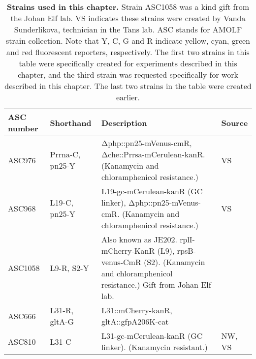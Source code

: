\begin{table}[h]
    \begin{tabularx}{\textwidth}{llXl}
        \textbf{ASC number}	& \textbf{Shorthand} & \textbf{Description} & \textbf{Source}		\\
        \hline
        ASC976  &	Prrna-C, pn25-Y	&	Δphp::pn25-mVenus-cmR, Δche::Prrsa-mCerulean-kanR. (Kanamycin and chloramphenicol resistance.)  & VS \\
        ASC968	& L19-C, pn25-Y	& L19-gc-mCerulean-kanR (GC linker), Δphp::pn25-mVenus-cmR.	(Kanamycin and chloramphenicol resistance.)	& VS \\
        ASC1058	& L9-R, S2-Y	& Also known as JE202. rplI-mCherry-KanR (L9), rpsB-venus-CmR (S2). (Kanamycin and chloramphenicol resistance.) Gift from Johan Elf lab. & \cite{Wallden2016} \\
        \hline
        ASC666 & L31-R, gltA-G  & L31::mCherry-kanR, gltA::gfpA206K-cat & \cite{Kiviet2014} \\
        ASC810	& L31-C & L31-gc-mCerulean-kanR (GC linker). (Kanamycin resistant.) & NW, VS \\
        \hline
    \end{tabularx}
    \caption{\textbf{Strains used in this chapter.} Strain ASC1058 was a kind gift from the Johan Elf lab. VS indicates these strains were created by Vanda Sunderlikova, technician in the Tans lab. ASC stands for AMOLF strain collection. Note that Y, C, G and R indicate yellow, cyan, green and red fluorescent reporters, respectively. The first two strains in this table were specifically created for experiments described in this chapter, and the third strain was requested specifically for work described in this chapter. The last two strains in the table were created earlier.}
    \label{table:ribostrains1}
\end{table}

